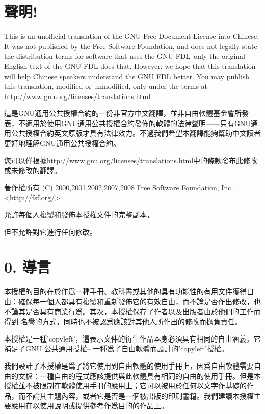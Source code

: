 \section{聲明!}
This is an unofficial translation of the GNU Free Document License into Chinese. It was not published by the Free Software Foundation, and does not legally state the distribution terms for software that uses the GNU FDL--only the original English text of the GNU FDL does that. However, we hope that this translation will help Chinese speakers understand the GNU FDL better. You may publish this translation, modified or unmodified, only under the terms at http://www.gnu.org/licenses/translations.html\par
這是GNU通用公共授權合約的一份非官方中文翻譯，並非自由軟體基金會所發表，不適用於使用GNU通用公共授權合約發佈的軟體的法律聲明——只有GNU通用公共授權合約英文原版才具有法律效力。不過我們希望本翻譯能夠幫助中文讀者更好地理解GNU通用公共授權合約。\par 您可以僅根據http://www.gnu.org/licenses/translations.html中的條款發布此修改或未修改的翻譯。\par
著作權所有 (C) 2000,2001,2002,2007,2008 Free Software Foundation, Inc.<\url{http://fsf.org/}>\par
允許每個人複製和發佈本授權文件的完整副本，\par
但不允許對它進行任何修改。
\section{0. 導言}
本授權的目的在於作爲一種手冊、教科書或其他的具有功能性的有用文件獲得自由：確保每一個人都具有複製和重新發佈它的有效自由，而不論是否作出修改，也不論其是否具有商業行爲。其次，本授權保存了作者以及出版者由於他們的工作而 得到 名譽的方式，同時也不被認爲應該對其他人所作出的修改而擔負責任。\par
本授權是一種’copyleft’，這表示文件的衍生作品本身必須具有相同的自由涵義。它補足了GNU 公共通用授權-- 一種爲了自由軟體而設計的’copyleft’授權。\par
我們設計了本授權是爲了將它使用到自由軟體的使用手冊上，因爲自由軟體需要自由的文檔：一種自由的程式應該提供與此軟體具有相同的自由的使用手冊。但是本授權並不被限制在軟體使用手冊的應用上；它可以被用於任何以文字作基礎的作品，而不論其主題內容，或者它是否是一個被出版的印刷書籍。我們建議本授權主要應用在以使用說明或提供參考作爲目的的作品上。
